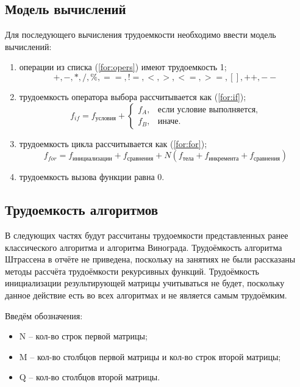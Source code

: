 \subsection{Модель вычислений}
Для последующего вычисления трудоемкости необходимо ввести модель вычислений:
\begin{enumerate}
	\item операции из списка (\ref{for:opers}) имеют трудоемкость 1;
	\begin{equation}
		\label{for:opers}
		+, -, *, /, \%, ==, !=, <, >, <=, >=, [], ++, {-}-
	\end{equation}
	\item трудоемкость оператора выбора  рассчитывается как (\ref{for:if});
	\begin{equation}
		\label{for:if}
		f_{if} = f_{\text{условия}} +
		\begin{cases}
			f_A, & \text{если условие выполняется,}\\
			f_B, & \text{иначе.}
		\end{cases}
	\end{equation}
	\item трудоемкость цикла рассчитывается как (\ref{for:for});
	\begin{equation}
		\label{for:for}
		f_{for} = f_{\text{инициализации}} + f_{\text{сравнения}} + N(f_{\text{тела}} + f_{\text{инкремента}} + f_{\text{сравнения}})
	\end{equation}
	\item трудоемкость вызова функции равна 0.
\end{enumerate}


\subsection{Трудоемкость алгоритмов}

В следующих частях будут рассчитаны трудоемкости представленных ранее классического алгоритма и алгоритма Винограда.
Трудоёмкость алгоритма Штрассена в отчёте не приведена, поскольку на занятиях не были рассказаны методы рассчёта трудоёмкости рекурсивных функций.
Трудоёмкость инициализации результирующей матрицы учитываться не будет, поскольку данное действие есть во всех алгоритмах и не является самым трудоёмким.

Введём обозначения:
\begin{itemize}
	\item N -- кол-во строк первой матрицы;
	\item M -- кол-во столбцов первой матрицы и кол-во строк второй матрицы;
	\item Q -- кол-во столбцов второй матрицы.
	
\end{itemize}

